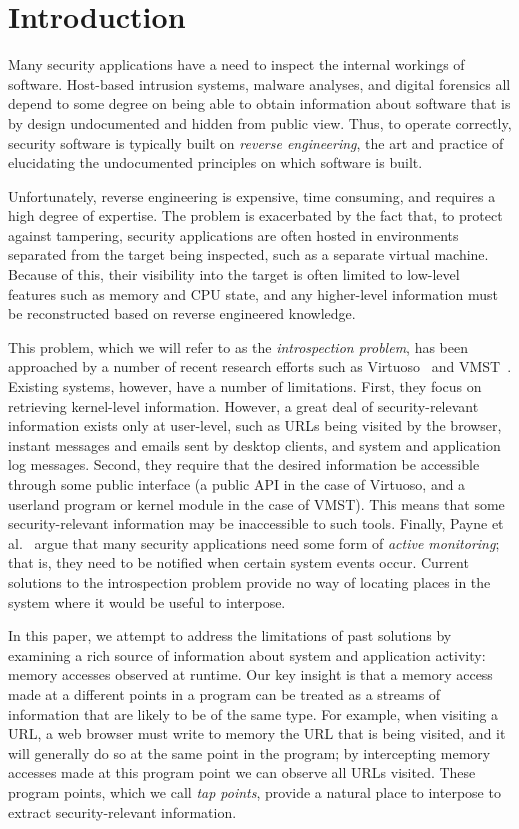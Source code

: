 \section{Introduction}
\label{sec:introduction}

Many security applications have a need to inspect the internal workings
of software. Host-based intrusion systems, malware analyses, and
digital forensics all depend to some degree on being able to obtain
information about software that is by design undocumented and hidden
from public view. Thus, to operate correctly, security software is
typically built on \emph{reverse engineering}, the art and practice of
elucidating the undocumented principles on which software is built.

Unfortunately, reverse engineering is expensive, time consuming, and
requires a high degree of expertise. The problem is exacerbated by the
fact that, to protect against tampering, security applications are often
hosted in environments separated from the target being inspected, such
as a separate virtual machine. Because of this, their visibility into
the target is often limited to low-level features such as memory and CPU
state, and any higher-level information must be reconstructed based on
reverse engineered knowledge.

This problem, which we will refer to as the \emph{introspection
problem}, has been approached by a number of recent research efforts
such as Virtuoso~\cite{Dolan-Gavitt:2011uq} and VMST~\cite{Fu:2012fk}.
Existing systems, however, have a number of limitations. First, they
focus on retrieving kernel-level information. However, a great deal of
security-relevant information exists only at user-level, such as URLs
being visited by the browser, instant messages and emails sent by
desktop clients, and system and application log messages. Second,
they require that the desired information be accessible through some
public interface (a public API in the case of Virtuoso, and a userland
program or kernel module in the case of VMST). This means that some
security-relevant information may be inaccessible to such tools.
Finally, Payne et al.~\cite{payne:2008} argue that many security
applications need some form of \emph{active monitoring}; that is, they
need to be notified when certain system events occur. Current solutions
to the introspection problem provide no way of locating places in the
system where it would be useful to interpose.

In this paper, we attempt to address the limitations of past solutions
by examining a rich source of information about system and application
activity: memory accesses observed at runtime. Our key insight is that a
memory access made at a different points in a program can be treated as
a streams of information that are likely to be of the same type. For
example, when visiting a URL, a web browser must write to memory the URL
that is being visited, and it will generally do so at the same point in
the program; by intercepting memory accesses made at this program point
we can observe all URLs visited. These program points, which we call
\emph{tap points}, provide a natural place to interpose to extract
security-relevant information.

